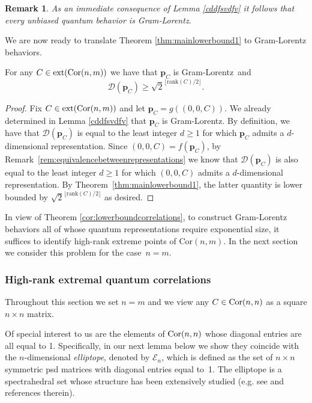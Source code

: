 \documentclass{siamart}
\newtheorem{remark}{Remark}[section]
\begin{document}
{\medskip

\begin{remark}\label{rem:unbiasedgramlorentz}
As an immediate consequence of  Lemma \ref{cddfsvdfv} it follows that every unbiased quantum behavior is Gram-Lorentz.
\end{remark}

\medskip
We are now ready to   translate  Theorem \ref{thm:mainlowerbound1} to Gram-Lorentz behaviors.

\medskip
\begin{theorem}\label{cor:lowerboundcorrelations}
For any {$C\in {\rm ext}({\mathrm{Cor}(n,m)})$} we have that ${\mathbf{p}}_C$ is Gram-Lorentz~and
$$\mathcal{D}({\mathbf{p}}_{C})\ge {\sqrt{2}^{\lfloor {\mathrm{rank}}(C)/ 2\rfloor}}.$$
\end{theorem}

\begin{proof}
{Fix $C\in {\rm ext}({\mathrm{Cor}(n,m)})$} and let {${\mathbf{p}}_C=g((0,0,C))$}.
We already determined  in Lemma \ref{cddfsvdfv} that ${\mathbf{p}}_C$ is Gram-Lorentz.
{By definition,
we have that $\mathcal{D}({\mathbf{p}}_{C})$ is equal to the {least} integer $d\ge 1$ for which ${\mathbf{p}}_C$ admits  a $d$-dimensional representation. Since $(0,0,C) = f({\mathbf{p}}_C)$, by Remark~\ref{rem:equivalencebetweenrepresentations} we know that $\mathcal{D}({\mathbf{p}}_{C})$ is also equal to the {least} integer $d\ge 1$ for which $(0,0,C)$ admits  a $d$-dimensional representation.
By Theorem~\ref{thm:mainlowerbound1}, the latter quantity is lower bounded by {$\sqrt{2}^{\lfloor {\mathrm{rank}}(C)/ 2 \rfloor}$} as desired.}
\end{proof}
\medskip

In view of Theorem  \ref{cor:lowerboundcorrelations},  to construct Gram-Lorentz behaviors all of whose quantum representations require exponential size, it suffices to identify high-rank extreme points of ${\mathrm{Cor}(n,m)}.$ In the next section we consider this problem {for} the case~$n=m$.

\subsubsection{High-rank extremal quantum correlations}
\label{sec:extremepoints}

Throughout this section we set  $n=m$ and we  view   any   $C\in {\rm Cor}(n,n)$ as  a square $ n\times n$ matrix.

Of special interest to us  are the  elements of ${\rm Cor}(n,n)$ whose diagonal entries are all equal to 1.
Specifically, in our next lemma below we show they coincide with the  $n$-dimensional {\em elliptope}, denoted by ${\mathcal{E}}_n$, which is defined as the set of $n\times n$ symmetric psd matrices with  diagonal entries   equal to~1. The elliptope is a spectrahedral set  whose structure has  been  extensively  studied (e.g. see \cite{DL} and references therein).

}
\end{document}
